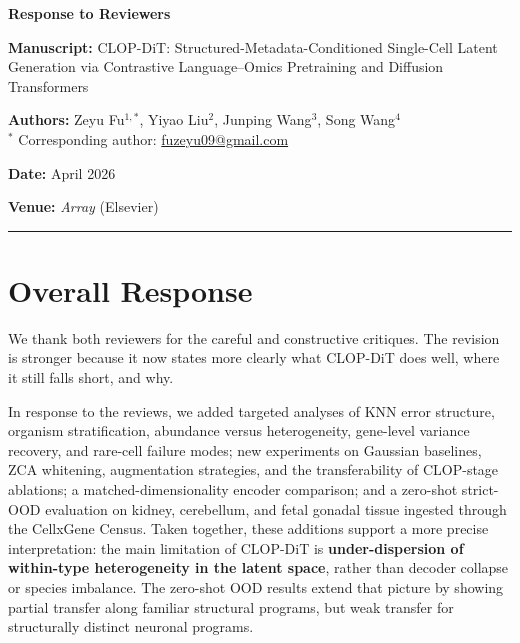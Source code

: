 \documentclass[11pt,letterpaper]{article}
\title{}
\author{}
\date{}
\begin{document}
\noindent
{\LARGE\bfseries Response to Reviewers\par}
\vspace{0.6em}

\noindent\textbf{Manuscript:} CLOP-DiT: Structured-Metadata-Conditioned Single-Cell Latent Generation via Contrastive Language--Omics Pretraining and Diffusion Transformers

\noindent\textbf{Authors:} Zeyu Fu$^{1,*}$, Yiyao Liu$^{2}$, Junping Wang$^{3}$, Song Wang$^{4}$\\
$^*$ Corresponding author: \href{mailto:fuzeyu09@gmail.com}{fuzeyu09@gmail.com}

\noindent\textbf{Date:} April 2026

\noindent\textbf{Venue:} \emph{Array} (Elsevier)

\vspace{0.8em}
\hrule
\vspace{0.8em}

\section*{Overall Response}

We thank both reviewers for the careful and constructive critiques. The revision is stronger because it now states more clearly what CLOP-DiT does well, where it still falls short, and why.

In response to the reviews, we added targeted analyses of KNN error structure, organism stratification, abundance versus heterogeneity, gene-level variance recovery, and rare-cell failure modes; new experiments on Gaussian baselines, ZCA whitening, augmentation strategies, and the transferability of CLOP-stage ablations; a matched-dimensionality encoder comparison; and a zero-shot strict-OOD evaluation on kidney, cerebellum, and fetal gonadal tissue ingested through the CellxGene Census. Taken together, these additions support a more precise interpretation: the main limitation of CLOP-DiT is \textbf{under-dispersion of within-type heterogeneity in the latent space}, rather than decoder collapse or species imbalance. The zero-shot OOD results extend that picture by showing partial transfer along familiar structural programs, but weak transfer for structurally distinct neuronal programs.
\end{document}
